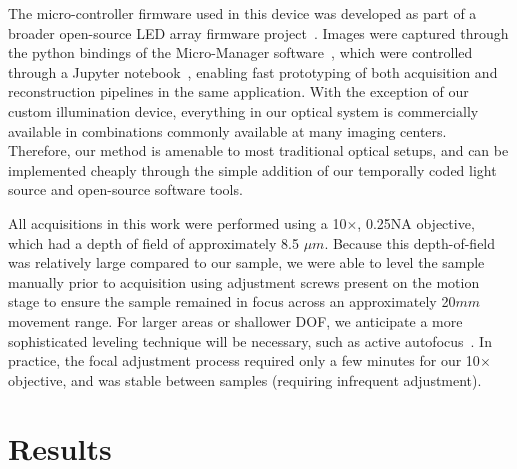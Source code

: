 The micro-controller firmware used in this device was developed as part of a broader open-source LED array firmware project~\cite{illuminate}. Images were captured through the python bindings of the Micro-Manager software~\cite{micromanager}, which were controlled through a Jupyter notebook~\cite{Kluyver:2016aa}, enabling fast prototyping of both acquisition and reconstruction pipelines in the same application. With the exception of our custom illumination device, everything in our optical system is commercially available in combinations commonly available at many imaging centers. Therefore, our method is amenable to most traditional optical setups, and can be implemented cheaply through the simple addition of our temporally coded light source and open-source software tools.

All acquisitions in this work were performed using a 10$\times$, 0.25NA objective, which had a depth of field of approximately 8.5 $\mu m$. Because this depth-of-field was relatively large compared to our sample, we were able to level the sample manually prior to acquisition using adjustment screws present on the motion stage to ensure the sample remained in focus across an approximately 20$mm$ movement range. For larger areas or shallower DOF, we anticipate a more sophisticated leveling technique will be necessary, such as active autofocus~\cite{nikonperfect, zeissdefinite}. In practice, the focal adjustment process required only a few minutes for our 10$\times$ objective, and was stable between samples (requiring infrequent adjustment).

\section{Results}\label{sec:highthroughput:results}
